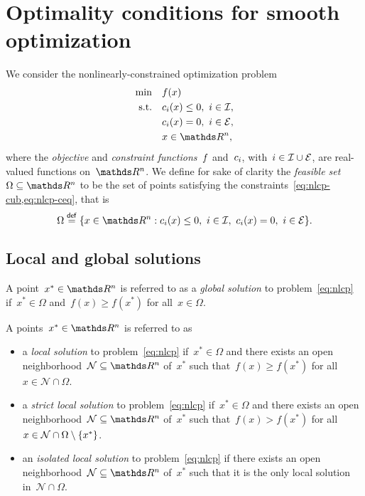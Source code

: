 \section{Optimality conditions for smooth optimization}

We consider the nonlinearly-constrained optimization problem
\begin{subequations}
    \label{eq:nlcp}
    \begin{align}
        \min        & \quad \obj(x) \label{eq:nlcp-obj}\\
        \text{s.t.} & \quad \con{i}(x) \le 0, ~ i \in \iub, \label{eq:nlcp-cub}\\
                    & \quad \con{i}(x) = 0, ~ i \in \ieq, \label{eq:nlcp-ceq}\\
                    & \quad x \in \R^n, \nonumber
    \end{align}
\end{subequations}
where the \emph{objective} and \emph{constraint functions}~$f$ and~$c_{i}$, with~$i \in \mathcal{I} \cup \mathcal{E}$, are real-valued functions on~$\R^n$.
We define for sake of clarity the \emph{feasible set}~$\Omega \subseteq \R^n$ to be the set of points satisfying the constraints~\cref{eq:nlcp-cub,eq:nlcp-ceq}, that is
\begin{equation*}
    \Omega \eqdef \set{x \in \R^n : \con{i}(x) \le 0, ~ i \in \iub, ~ \con{i}(x) = 0, ~ i \in \ieq}.
\end{equation*}

\subsection{Local and global solutions}

\begin{definition}
    A point~$x^{\ast} \in \R^n$ is referred to as a \emph{global solution} to problem~\cref{eq:nlcp} if~$x^{\ast} \in \Omega$ and~$f(x) \ge f(x^{\ast})$ for all~$x \in \Omega$.
\end{definition}

\begin{definition}
    A points~$x^{\ast} \in \R^n$ is referred to as
    \begin{itemize}
        \item a \emph{local solution} to problem~\cref{eq:nlcp} if~$x^{\ast} \in \Omega$ and there exists an open neighborhood~$\mathcal{N} \subseteq \R^n$ of~$x^{\ast}$ such that~$f(x) \ge f(x^{\ast})$ for all~$x \in \mathcal{N} \cap \Omega$.
        \item a \emph{strict local solution} to problem~\cref{eq:nlcp} if~$x^{\ast} \in \Omega$ and there exists an open neighborhood~$\mathcal{N} \subseteq \R^n$ of~$x^{\ast}$ such that~$f(x) > f(x^{\ast})$ for all~$x \in \mathcal{N} \cap \Omega \setminus \{x^{\ast}\}$.
        \item an \emph{isolated local solution} to problem~\cref{eq:nlcp} if there exists an open neighborhood~$\mathcal{N} \subseteq \R^n$ of~$x^{\ast}$ such that it is the only local solution in~$\mathcal{N} \cap \Omega$.
    \end{itemize}
\end{definition}


